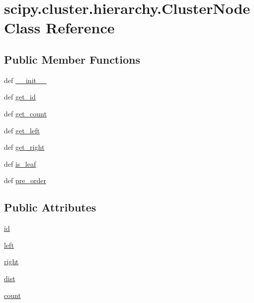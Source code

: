 \hypertarget{classscipy_1_1cluster_1_1hierarchy_1_1ClusterNode}{}\section{scipy.\+cluster.\+hierarchy.\+Cluster\+Node Class Reference}
\label{classscipy_1_1cluster_1_1hierarchy_1_1ClusterNode}
\subsection*{Public Member Functions}
\begin{DoxyCompactItemize}
\item 
def \hyperlink{classscipy_1_1cluster_1_1hierarchy_1_1ClusterNode_a0c77add827c006543fe7c20b98258a1f}{\+\_\+\+\_\+init\+\_\+\+\_\+}
\item 
def \hyperlink{classscipy_1_1cluster_1_1hierarchy_1_1ClusterNode_a5255f73a4b91661bdbde3b12f5f39e84}{get\+\_\+id}
\item 
def \hyperlink{classscipy_1_1cluster_1_1hierarchy_1_1ClusterNode_ab60eb73019a05a1e1d4370781c9cbb10}{get\+\_\+count}
\item 
def \hyperlink{classscipy_1_1cluster_1_1hierarchy_1_1ClusterNode_a03741b0243d50112120708cce8269828}{get\+\_\+left}
\item 
def \hyperlink{classscipy_1_1cluster_1_1hierarchy_1_1ClusterNode_a7c0c5bc71e4ecbc3a7884203f33e27c6}{get\+\_\+right}
\item 
def \hyperlink{classscipy_1_1cluster_1_1hierarchy_1_1ClusterNode_a3c14621515b7ece8d29781843ac080ec}{is\+\_\+leaf}
\item 
def \hyperlink{classscipy_1_1cluster_1_1hierarchy_1_1ClusterNode_a6e4d7620f3bd1c7269ac1761646de4c5}{pre\+\_\+order}
\end{DoxyCompactItemize}
\subsection*{Public Attributes}
\begin{DoxyCompactItemize}
\item 
\hyperlink{classscipy_1_1cluster_1_1hierarchy_1_1ClusterNode_a33a3651b872cce6ececa0632613ab950}{id}
\item 
\hyperlink{classscipy_1_1cluster_1_1hierarchy_1_1ClusterNode_a289f67739ecb94da191ec5d6f5a4977a}{left}
\item 
\hyperlink{classscipy_1_1cluster_1_1hierarchy_1_1ClusterNode_a79b2cad6da3ba1a2d9962ccd7cacf3f4}{right}
\item 
\hyperlink{classscipy_1_1cluster_1_1hierarchy_1_1ClusterNode_a9f65b1e44aafb91c95857ed6c7132b69}{dist}
\item 
\hyperlink{classscipy_1_1cluster_1_1hierarchy_1_1ClusterNode_a6b8d33da76d118bf9c4669e8b7833d7e}{count}
\end{DoxyCompactItemize}


